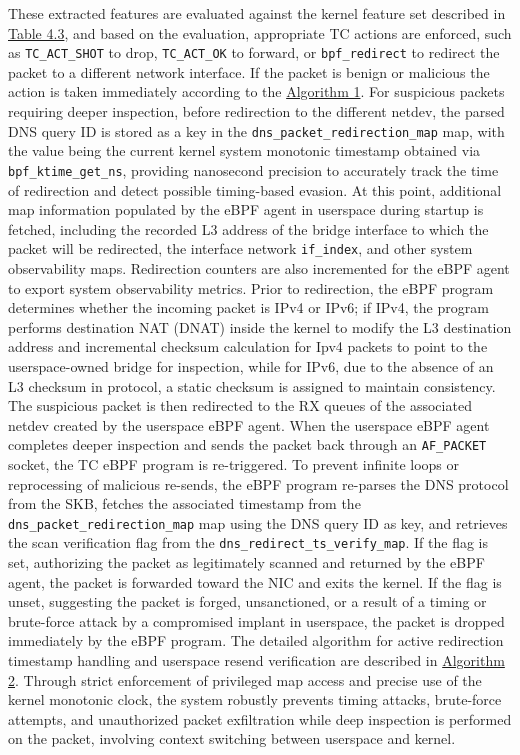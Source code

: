 \documentclass [11pt, proquest] {uwthesis}[2020/02/24]
\begin{document}
These extracted features are evaluated against the kernel feature set described in \hyperref[sec:feature-kernel]{Table 4.3}, and based on the evaluation, appropriate TC actions are enforced, such as \texttt{TC\_ACT\_SHOT} to drop, \texttt{TC\_ACT\_OK} to forward, or \texttt{bpf\_redirect} to redirect the packet to a different network interface. If the packet is benign or malicious the action is taken immediately according to the \hyperref[sec:alg1]{Algorithm 1}. For suspicious packets requiring deeper inspection, before redirection to the different netdev, the parsed DNS query ID is stored as a key in the \texttt{dns\_packet\_redirection\_map} map, with the value being the current kernel system monotonic timestamp obtained via \texttt{bpf\_ktime\_get\_ns}, providing nanosecond precision to accurately track the time of redirection and detect possible timing-based evasion. At this point, additional map information populated by the eBPF agent in userspace during startup is fetched, including the recorded L3 address of the bridge interface to which the packet will be redirected, the interface network \texttt{if\_index}, and other system observability maps. Redirection counters are also incremented for the eBPF agent to export system observability metrics. Prior to redirection, the eBPF program determines whether the incoming packet is IPv4 or IPv6; if IPv4, the program performs destination NAT (DNAT) inside the kernel to modify the L3 destination address and incremental checksum calculation for Ipv4 packets to point to the userspace-owned bridge for inspection, while for IPv6, due to the absence of an L3 checksum in protocol, a static checksum is assigned to maintain consistency. The suspicious packet is then redirected to the RX queues of the associated netdev created by the userspace eBPF agent. When the userspace eBPF agent completes deeper inspection and sends the packet back through an \texttt{AF\_PACKET} socket, the TC eBPF program is re-triggered. To prevent infinite loops or reprocessing of malicious re-sends, the eBPF program re-parses the DNS protocol from the SKB, fetches the associated timestamp from the \texttt{dns\_packet\_redirection\_map} map using the DNS query ID as key, and retrieves the scan verification flag from the \texttt{dns\_redirect\_ts\_verify\_map}. If the flag is set, authorizing the packet as legitimately scanned and returned by the eBPF agent, the packet is forwarded toward the NIC and exits the kernel. If the flag is unset, suggesting the packet is forged, unsanctioned, or a result of a timing or brute-force attack by a compromised implant in userspace, the packet is dropped immediately by the eBPF program. The detailed algorithm for active redirection timestamp handling and userspace resend verification are described in \hyperref[sec:alg2]{Algorithm 2}. Through strict enforcement of privileged map access and precise use of the kernel monotonic clock, the system robustly prevents timing attacks, brute-force attempts, and unauthorized packet exfiltration while deep inspection is performed on the packet, involving context switching between userspace and kernel.
\end{document}

